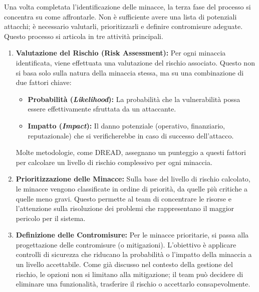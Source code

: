 Una volta completata l'identificazione delle minacce, la terza fase del processo si concentra su come affrontarle. Non è sufficiente avere una lista di potenziali attacchi; è necessario valutarli, prioritizzarli e definire contromisure adeguate. Questo processo si articola in tre attività principali.

\begin{enumerate}
    \item \textbf{Valutazione del Rischio (Risk Assessment):}
    Per ogni minaccia identificata, viene effettuata una valutazione del rischio associato. Questo non si basa solo sulla natura della minaccia stessa, ma su una combinazione di due fattori chiave:
    \begin{itemize}
        \item \textbf{Probabilità (\textit{Likelihood}):} La probabilità che la vulnerabilità possa essere effettivamente sfruttata da un attaccante.
        \item \textbf{Impatto (\textit{Impact}):} Il danno potenziale (operativo, finanziario, reputazionale) che si verificherebbe in caso di successo dell'attacco.
    \end{itemize}
     Molte metodologie, come DREAD, assegnano un punteggio a questi fattori per calcolare un livello di rischio complessivo per ogni minaccia.
    \item \textbf{Prioritizzazione delle Minacce:}
    Sulla base del livello di rischio calcolato, le minacce vengono classificate in ordine di priorità, da quelle più critiche a quelle meno gravi. Questo permette al team di concentrare le risorse e l'attenzione sulla risoluzione dei problemi che rappresentano il maggior pericolo per il sistema.
    \item \textbf{Definizione delle Contromisure:}
    Per le minacce prioritarie, si passa alla progettazione delle contromisure (o mitigazioni). L'obiettivo è applicare controlli di sicurezza che riducano la probabilità o l'impatto della minaccia a un livello accettabile. Come già discusso nel contesto della gestione del rischio, le opzioni non si limitano alla mitigazione; il team può decidere di eliminare una funzionalità, trasferire il rischio o accettarlo consapevolmente.
\end{enumerate}

